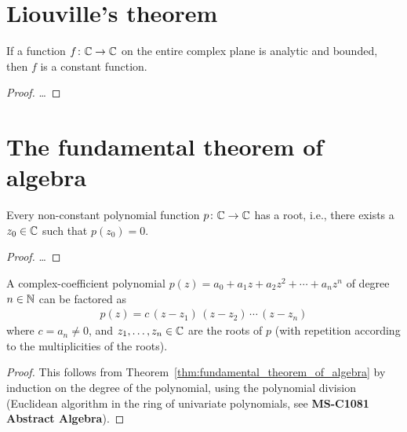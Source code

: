 \section{Liouville's theorem}

\begin{theorem}
  \label{thm:liouville}
  If a function $f \colon \mathbb{C} \to \mathbb{C}$ on the entire complex plane
  is analytic and bounded, then $f$ is a constant function.
\end{theorem}
\begin{proof}
  \ldots
\end{proof}



\section{The fundamental theorem of algebra}

\begin{theorem}
  \label{thm:FUNDAMENTAL_THEOREM_OF_ALGEBRA}
  Every non-constant polynomial function $p \colon \mathbb{C} \to \mathbb{C}$
  has a root, i.e., there exists a $z_0 \in \mathbb{C}$ such that $p(z_0) = 0$.
\end{theorem}
\begin{proof}
  \ldots
\end{proof}

\begin{corollary}
  \label{cor:complex_polynomial_factorization}
  A complex-coefficient
  polynomial $p(z) = a_0 + a_1 z + a_2 z^2 + \cdots + a_n z^n$
  of degree $n \in \mathbb{N}$ can be factored as
  \begin{align*}
    p(z) = c \, (z - z_1) \, (z - z_2) \, \cdots \, (z - z_n)
  \end{align*}
  where $c = a_n \ne 0$, and $z_1 , \ldots, z_n \in \mathbb{C}$
  are the roots of $p$ (with repetition according to the
  multiplicities of the roots).
\end{corollary}
\begin{proof}
  This follows from Theorem~\ref{thm:fundamental_theorem_of_algebra}
  by induction on the degree of the polynomial,
  using the polynomial division (Euclidean algorithm in the
  ring of univariate polynomials, see \textbf{MS-C1081 Abstract Algebra}).
\end{proof}




